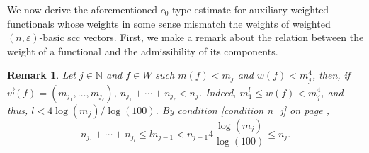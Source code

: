 \documentclass[12pt,a4paper]{amsart}
\newcommand{\N}{\mathbb{N}}
\newcommand{\ep}{\varepsilon}
\theoremstyle{definition}
\theoremstyle{plain}
\newtheorem{remark}[question]{Remark}
\begin{document}
We now derive the aforementioned $c_{0}$-type estimate for auxiliary weighted functionals whose weights in some sense mismatch the weights of weighted $(n,\ep)$-basic scc vectors. First, we make a remark about the relation between the weight of a functional and the admissibility of its components.



\begin{remark}
\label{weight-to-admissibility condition}
Let $j\in\N$ and $f\in W$ such  $m(f)<m_j$ and $w(f) < m_j^4$, then, if $\vec w(f)= (m_{j_1},\ldots,m_{j_\ell})$, $n_{j_1}+\cdots +n_{j_\ell} < n_j$. Indeed, $m_{1}^{l}\leq w(f) <m_{j}^{4}$, and thus, $l<4\log(m_{j})/\log(100)$. By condition \ref{condition n_j} on page \pageref{condition n_j},
\[n_{j_{1}}+\cdots+n_{j_{l}}\leq ln_{j-1}< n_{j-1}4\frac{\log(m_{j})}{\log(100)}\leq n_{j}.\]
\end{remark}
\end{document}

